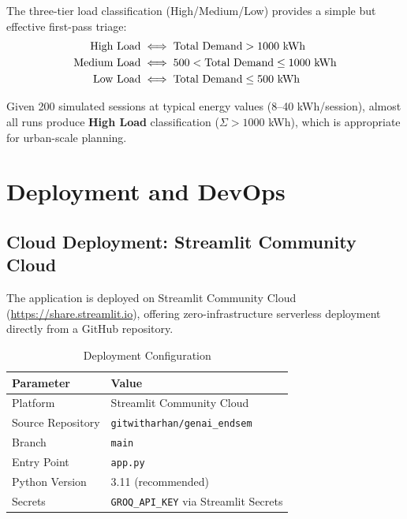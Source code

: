 \documentclass[12pt,a4paper]{article}
\newcommand{\code}[1]{\texttt{\small\color{blue!70!black}#1}}
\begin{document}
The three-tier load classification (High/Medium/Low) provides a simple but effective first-pass triage:
\begin{align}
\text{High Load} &\iff \text{Total Demand} > 1000\ \text{kWh} \notag \\
\text{Medium Load} &\iff 500 < \text{Total Demand} \leq 1000\ \text{kWh} \notag \\
\text{Low Load} &\iff \text{Total Demand} \leq 500\ \text{kWh} \notag
\end{align}

Given 200 simulated sessions at typical energy values (8--40 kWh/session), almost all runs produce \textbf{High Load} classification ($\Sigma > 1000$ kWh), which is appropriate for urban-scale planning.

\newpage

\section{Deployment and DevOps}

\subsection{Cloud Deployment: Streamlit Community Cloud}

The application is deployed on Streamlit Community Cloud (\url{https://share.streamlit.io}), offering zero-infrastructure serverless deployment directly from a GitHub repository.

\begin{table}[H]
\centering
\caption{Deployment Configuration}
\begin{tabular}{ll}
\toprule
\textbf{Parameter} & \textbf{Value} \\
\midrule
Platform          & Streamlit Community Cloud \\
Source Repository & \code{gitwitharhan/genai\_endsem} \\
Branch            & \code{main} \\
Entry Point       & \code{app.py} \\
Python Version    & 3.11 (recommended) \\
Secrets           & \code{GROQ\_API\_KEY} via Streamlit Secrets \\
\bottomrule
\end{tabular}
\end{table}
\end{document}
